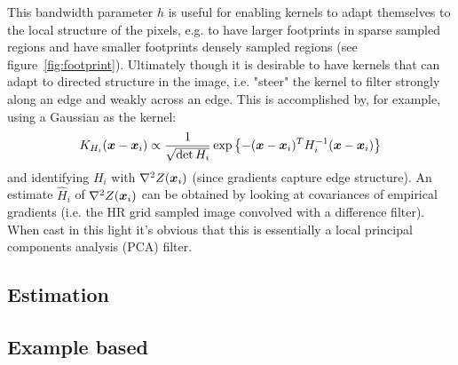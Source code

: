 %
This bandwidth parameter $h$ is useful for enabling kernels to adapt themselves to the local structure of the pixels, e.g. to have larger footprints in sparse sampled regions and have smaller footprints densely sampled regions (see figure~\ref{fig:footprint}).
%
Ultimately though it is desirable to have kernels that can adapt to directed structure in the image, i.e. "steer" the kernel to filter strongly along an edge and weakly across an edge.
%
This is accomplished by, for example, using a Gaussian as the kernel:
\begin{equation}
    K_{H_i}(\bm{x} - \bm{x}_i) \propto \frac{1}{\sqrt{\det{H_i}}}\exp\left\{ -(\bm{x} - \bm{x}_i)^T H^{-1}_i (\bm{x} - \bm{x}_i) \right\}
\end{equation}
and identifying $H_i$ with $\nabla^2 Z(\bm{x}_i)$ (since gradients capture edge structure).
%
An estimate $\hat{H}_i$ of $\nabla^2 Z(\bm{x}_i)$ can be obtained by looking at covariances of empirical gradients (i.e. the HR grid sampled image convolved with a difference filter).
%
When cast in this light it's obvious that this is essentially a local principal components analysis (PCA) filter.





\subsection{Estimation}
\subsection{Example based}
